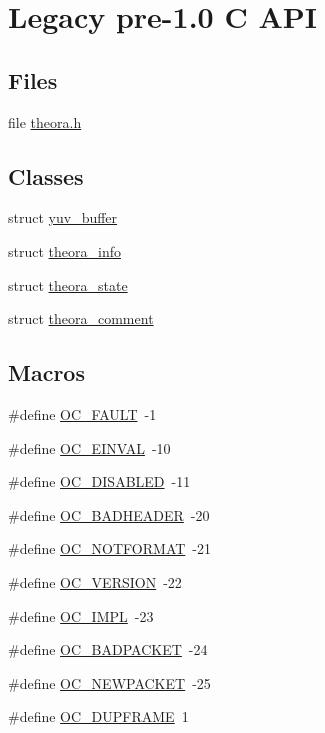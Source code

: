 \hypertarget{group__oldfuncs}{\section{Legacy pre-\/1.0 C A\+P\+I}
\label{group__oldfuncs}
}
\subsection*{Files}
\begin{DoxyCompactItemize}
\item 
file \hyperlink{theora_8h}{theora.\+h}
\end{DoxyCompactItemize}
\subsection*{Classes}
\begin{DoxyCompactItemize}
\item 
struct \hyperlink{structyuv__buffer}{yuv\+\_\+buffer}
\item 
struct \hyperlink{structtheora__info}{theora\+\_\+info}
\item 
struct \hyperlink{structtheora__state}{theora\+\_\+state}
\item 
struct \hyperlink{structtheora__comment}{theora\+\_\+comment}
\end{DoxyCompactItemize}
\subsection*{Macros}
\begin{DoxyCompactItemize}
\item 
\#define \hyperlink{group__oldfuncs_gaa4370e13ed3aea6441ccf69dcab2506e}{O\+C\+\_\+\+F\+A\+U\+L\+T}~-\/1
\item 
\#define \hyperlink{group__oldfuncs_ga43d15091b1a03a734a124e9a04d3be55}{O\+C\+\_\+\+E\+I\+N\+V\+A\+L}~-\/10
\item 
\#define \hyperlink{group__oldfuncs_ga38b9fa0af856d5930c534db26e2ac2d1}{O\+C\+\_\+\+D\+I\+S\+A\+B\+L\+E\+D}~-\/11
\item 
\#define \hyperlink{group__oldfuncs_ga809cbad2eb36be17a235a3cadfb737ba}{O\+C\+\_\+\+B\+A\+D\+H\+E\+A\+D\+E\+R}~-\/20
\item 
\#define \hyperlink{group__oldfuncs_ga9558d6d9eacd2273c8da27f945d725ad}{O\+C\+\_\+\+N\+O\+T\+F\+O\+R\+M\+A\+T}~-\/21
\item 
\#define \hyperlink{group__oldfuncs_ga4611cfd61160405721d1e2ab0ec2564b}{O\+C\+\_\+\+V\+E\+R\+S\+I\+O\+N}~-\/22
\item 
\#define \hyperlink{group__oldfuncs_ga895dc2597b3bf9c97bf7701c6eff5b0c}{O\+C\+\_\+\+I\+M\+P\+L}~-\/23
\item 
\#define \hyperlink{group__oldfuncs_ga117774c062a63dfad2a5b4d092fa2bb1}{O\+C\+\_\+\+B\+A\+D\+P\+A\+C\+K\+E\+T}~-\/24
\item 
\#define \hyperlink{group__oldfuncs_ga60be4dc92c933eac3542bce3ce076496}{O\+C\+\_\+\+N\+E\+W\+P\+A\+C\+K\+E\+T}~-\/25
\item 
\#define \hyperlink{group__oldfuncs_ga84a8d2f5080ad62b415a4e7551941cbb}{O\+C\+\_\+\+D\+U\+P\+F\+R\+A\+M\+E}~1
\end{DoxyCompactItemize}

